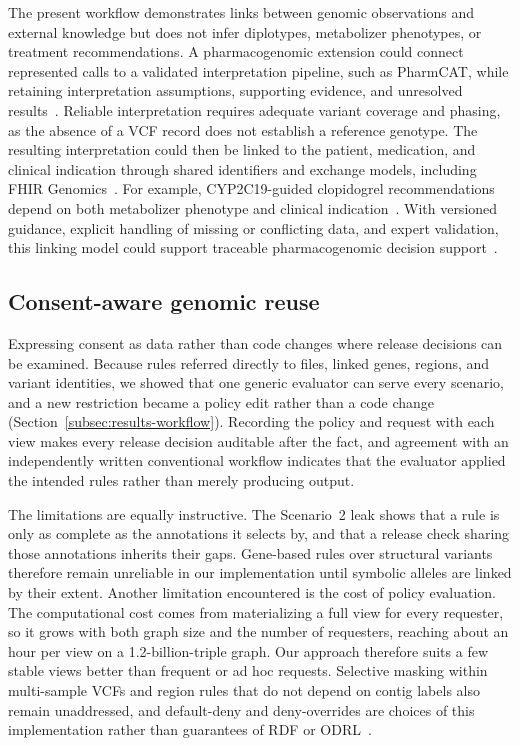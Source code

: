 \documentclass[pdflatex,sn-mathphys-num]{sn-jnl}
\begin{document}
The present workflow demonstrates links between genomic observations and external knowledge but does not infer diplotypes, metabolizer phenotypes, or treatment recommendations.
A pharmacogenomic extension could connect represented calls to a validated interpretation pipeline, such as PharmCAT, while retaining interpretation assumptions, supporting evidence, and unresolved results~\cite{pharmcat}.
Reliable interpretation requires adequate variant coverage and phasing, as the absence of a VCF record does not establish a reference genotype.
The resulting interpretation could then be linked to the patient, medication, and clinical indication through shared identifiers and exchange models, including FHIR Genomics~\cite{fhir_genomics_ig}.
For example, CYP2C19-guided clopidogrel recommendations depend on both metabolizer phenotype and clinical indication~\cite{lee2022clopidogrel}.
With versioned guidance, explicit handling of missing or conflicting data, and expert validation, this linking model could support traceable pharmacogenomic decision support~\cite{wake2022pgx}.

\subsection{Consent-aware genomic reuse}\label{subsec:disc-consent}
Expressing consent as data rather than code changes where release decisions can be examined.
Because rules referred directly to files, linked genes, regions, and variant identities, we showed that one generic evaluator can serve every scenario, and a new restriction became a policy edit rather than a code change (Section~\ref{subsec:results-workflow}).
Recording the policy and request with each view makes every release decision auditable after the fact, and agreement with an independently written conventional workflow indicates that the evaluator applied the intended rules rather than merely producing output.

The limitations are equally instructive.
The Scenario~2 leak shows that a rule is only as complete as the annotations it selects by, and that a release check sharing those annotations inherits their gaps.
Gene-based rules over structural variants therefore remain unreliable in our implementation until symbolic alleles are linked by their extent.
Another limitation encountered is the cost of policy evaluation.
The computational cost comes from materializing a full view for every requester, so it grows with both graph size and the number of requesters, reaching about an hour per view on a 1.2-billion-triple graph.
Our approach therefore suits a few stable views better than frequent or ad hoc requests.
Selective masking within multi-sample VCFs and region rules that do not depend on contig labels also remain unaddressed, and default-deny and deny-overrides are choices of this implementation rather than guarantees of RDF or ODRL~\cite{odrl_2018}.
\end{document}
